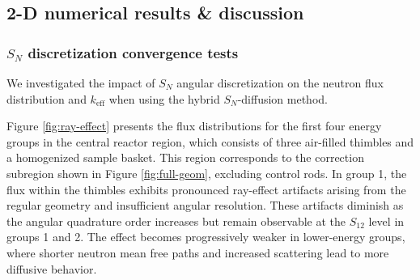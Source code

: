 \subsection{2-D numerical results \& discussion} \label{sec:2d-nts-results}

\subsubsection{$S_N$ discretization convergence tests}

We investigated the impact of $S_N$ angular discretization on the neutron flux distribution and
$k_\text{eff}$ when using the hybrid $S_N$-diffusion method.

Figure \ref{fig:ray-effect} presents the flux distributions for the
first four energy groups in the central reactor region, which consists of three
air-filled thimbles and a homogenized sample basket. This region corresponds
to the correction subregion shown in Figure \ref{fig:full-geom}, excluding control rods. In group
1, the flux within the thimbles exhibits pronounced ray-effect artifacts arising from the regular
geometry and insufficient angular resolution. These artifacts diminish as the angular quadrature
order increases but remain observable at the $S_{12}$ level in groups 1 and 2. The effect becomes
progressively weaker in lower-energy groups, where shorter neutron mean free paths and increased
scattering lead to more diffusive behavior.

